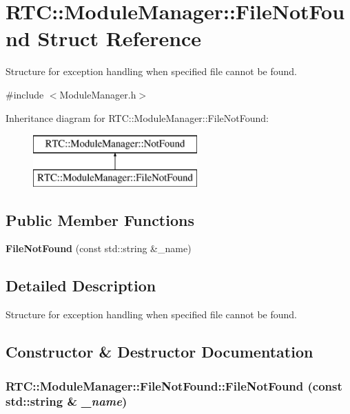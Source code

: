 \section{RTC::ModuleManager::FileNotFound Struct Reference}
\label{structRTC_1_1ModuleManager_1_1FileNotFound}


Structure for exception handling when specified file cannot be found.  




{\ttfamily \#include $<$ModuleManager.h$>$}

Inheritance diagram for RTC::ModuleManager::FileNotFound:\begin{figure}[H]
\begin{center}
\leavevmode
\includegraphics[height=2cm]{structRTC_1_1ModuleManager_1_1FileNotFound}
\end{center}
\end{figure}
\subsection*{Public Member Functions}
\begin{DoxyCompactItemize}
\item 
{\bf FileNotFound} (const std::string \&\_\-name)
\end{DoxyCompactItemize}


\subsection{Detailed Description}
Structure for exception handling when specified file cannot be found. 

\subsection{Constructor \& Destructor Documentation}
\subsubsection[{FileNotFound}]{\setlength{\rightskip}{0pt plus 5cm}RTC::ModuleManager::FileNotFound::FileNotFound (const std::string \& {\em \_\-name})\hspace{0.3cm}{\ttfamily  [inline]}}\label{structRTC_1_1ModuleManager_1_1FileNotFound_a698b99562aac6bba9516f645d7ea4f48}
